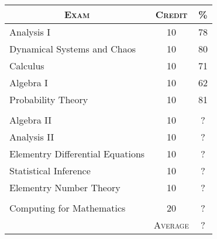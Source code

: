 \documentclass[a4paper, 11pt]{article}
\begin{document}
\begin{center}
\begin{tabular}{lcc}

\multicolumn{1}{c}{\textsc{Exam}} & \textsc{Credit}&\textsc{\%}\\ \hline
Analysis I & 10 & 78\\
Dynamical Systems and Chaos & 10 & 80\\
Calculus & 10 & 71\\
Algebra I & 10 & 62\\
Probability Theory & 10 & 81\\
\\
Algebra II & 10 & ?\\
Analysis II & 10 & ?\\
Elementry Differential Equations & 10 & ?\\
Statistical Inference & 10 & ?\\
Elementry Number Theory & 10 & ?\\
\\
Computing for Mathematics & 20 & ?\\
\cline{2-3}
&\textsc{Average}&?

\end{tabular}
\end{center}
\bigskip
\end{document}
